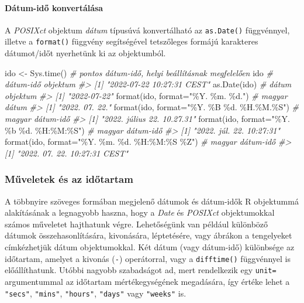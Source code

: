 \documentclass[
]{book}
\newenvironment{Shaded}{\begin{snugshade}}{\end{snugshade}}
\newcommand{\AttributeTok}[1]{\textcolor[rgb]{0.77,0.63,0.00}{#1}}
\newcommand{\CommentTok}[1]{\textcolor[rgb]{0.56,0.35,0.01}{\textit{#1}}}
\newcommand{\FunctionTok}[1]{\textcolor[rgb]{0.00,0.00,0.00}{#1}}
\newcommand{\NormalTok}[1]{#1}
\newcommand{\OtherTok}[1]{\textcolor[rgb]{0.56,0.35,0.01}{#1}}
\newcommand{\StringTok}[1]{\textcolor[rgb]{0.31,0.60,0.02}{#1}}
\begin{document}
\hypertarget{duxe1tum-idux151-konvertuxe1luxe1sa}{%
\paragraph{Dátum-idő konvertálása}\label{duxe1tum-idux151-konvertuxe1luxe1sa}}

A \emph{POSIXct} objektum \emph{dátum} típusúvá konvertálható az \texttt{as.Date()} függvénnyel, illetve a \texttt{format()} függvény segítségével tetszőleges formájú karakteres dátumot/időt nyerhetünk ki az objektumból.

\begin{Shaded}
\begin{Highlighting}[]
\NormalTok{ido }\OtherTok{\textless{}{-}} \FunctionTok{Sys.time}\NormalTok{()  }\CommentTok{\# pontos dátum{-}idő, helyi beállításnak megfelelően}
\NormalTok{ido                }\CommentTok{\# dátum{-}idő objektum}
\CommentTok{\#\textgreater{} [1] "2022{-}07{-}22 10:27:31 CEST"}
\FunctionTok{as.Date}\NormalTok{(ido)       }\CommentTok{\# dátum objektum}
\CommentTok{\#\textgreater{} [1] "2022{-}07{-}22"}
\FunctionTok{format}\NormalTok{(ido, }\AttributeTok{format=}\StringTok{"\%Y. \%m. \%d."}\NormalTok{)              }\CommentTok{\# magyar dátum}
\CommentTok{\#\textgreater{} [1] "2022. 07. 22."}
\FunctionTok{format}\NormalTok{(ido, }\AttributeTok{format=}\StringTok{"\%Y. \%B \%d. \%H.\%M.\%S"}\NormalTok{)      }\CommentTok{\# magyar dátum{-}idő}
\CommentTok{\#\textgreater{} [1] "2022. július 22. 10.27.31"}
\FunctionTok{format}\NormalTok{(ido, }\AttributeTok{format=}\StringTok{"\%Y. \%b \%d. \%H:\%M:\%S"}\NormalTok{)      }\CommentTok{\# magyar dátum{-}idő}
\CommentTok{\#\textgreater{} [1] "2022. júl. 22. 10:27:31"}
\FunctionTok{format}\NormalTok{(ido, }\AttributeTok{format=}\StringTok{"\%Y. \%m. \%d. \%H:\%M:\%S \%Z"}\NormalTok{)  }\CommentTok{\# magyar dátum{-}idő}
\CommentTok{\#\textgreater{} [1] "2022. 07. 22. 10:27:31 CEST"}
\end{Highlighting}
\end{Shaded}

\hypertarget{mux171veletek-uxe9s-az-idux151tartam}{%
\subsubsection{Műveletek és az időtartam}\label{mux171veletek-uxe9s-az-idux151tartam}}

A többnyire szöveges formában megjelenő dátumok és dátum-idők R objektummá alakításának a legnagyobb haszna, hogy a \emph{Date} és \emph{POSIXct} objektumokkal számos műveletet hajthatunk végre. Lehetőségünk van például különböző dátumok összehasonlítására, kivonására, léptetésére, vagy ábrákon a tengelyeket címkézhetjük dátum objektumokkal. Két dátum (vagy dátum-idő) különbsége az időtartam, amelyet a kivonás (\texttt{-}) operátorral, vagy a \texttt{difftime()} függvénnyel is előállíthatunk. Utóbbi nagyobb szabadságot ad, mert rendelkezik egy \texttt{unit=} argumentummal az időtartam mértékegységének megadására, így értéke lehet a \texttt{"secs"}, \texttt{"mins"}, \texttt{"hours"}, \texttt{"days"} vagy \texttt{"weeks"} is.
\end{document}
